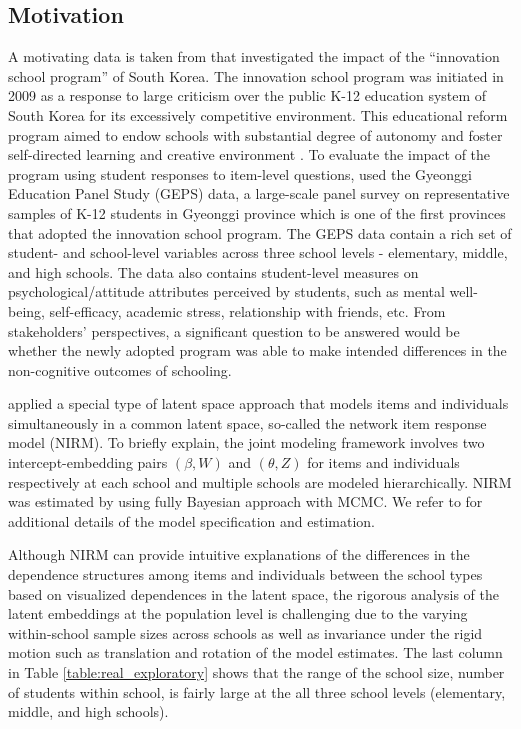 \documentclass[12pt]{article}
\begin{document}
\subsection{Motivation}

A motivating data is taken from  \cite{jin_hierarchical_2020} that investigated the impact of  the ``innovation school program'' of South  Korea. 
The innovation school program was initiated in 2009 as a response to large criticism over the public K-12 education system of South Korea for its excessively competitive environment. This educational reform program aimed to endow schools with substantial degree of autonomy and foster self-directed learning and creative environment  \citep{gyeonggi}. To evaluate the impact of the program using student responses to item-level questions,  \cite{jin_hierarchical_2020} used the Gyeonggi Education Panel Study (GEPS) data, a large-scale panel survey on representative samples of K-12 students in Gyeonggi province which is one of the first provinces that adopted the innovation school program. The GEPS data contain a rich set of student- and school-level variables across three school levels - elementary, middle, and high schools. The data also contains student-level measures on psychological/attitude attributes perceived by students, such as mental well-being, self-efficacy, academic stress, relationship with friends, etc. From stakeholders' perspectives, a significant question to be answered would be whether the newly adopted program was able to make intended differences in the non-cognitive outcomes of schooling. 

\cite{jin_doubly_2019} applied a special type of latent space approach that  models items and individuals simultaneously in a common latent space, so-called the network item response model (NIRM). To briefly explain,  the joint modeling framework  involves two intercept-embedding pairs $(\beta, W)$ and $(\theta, Z)$ for items and individuals respectively at each school and multiple schools are modeled hierarchically. NIRM was estimated by using fully Bayesian approach with MCMC. We refer to \cite{jin_doubly_2019} for additional details of the model specification and estimation. 

Although NIRM can provide intuitive explanations of the differences in the dependence structures among items and individuals between the school types based on visualized dependences in the latent space, the rigorous analysis of the latent embeddings at the population level is challenging due to the varying within-school sample sizes across schools  as well as invariance under the rigid motion such as translation and rotation of the model estimates. The last column in Table \ref{table:real_exploratory} shows that the range of the school size, number of students within school, is fairly large at the all three school levels (elementary, middle, and high schools). 
\end{document}
